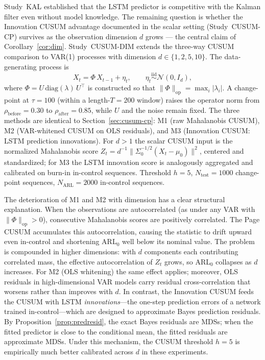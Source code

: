 \documentclass[bj,authoryear]{imsart}
\theoremstyle{plain}
\theoremstyle{definition}
\begin{document}
Study~KAL established that the LSTM predictor is competitive with the Kalman
filter even without model knowledge.
The remaining question is whether the Innovation CUSUM advantage documented
in the scalar setting (Study~CUSUM-CP) survives as the observation dimension $d$
grows --- the central claim of Corollary~\ref{cor:dim}.
Study~CUSUM-DIM extends the three-way CUSUM comparison to VAR(1) processes with
dimension $d \in \{1, 2, 5, 10\}$.
The data-generating process is
\[
  X_t = \Phi\,X_{t-1} + \eta_t, \qquad \eta_t \overset{\text{iid}}{\sim}
  \mathcal{N}(0, I_d),
\]
where $\Phi = U\,\mathrm{diag}(\lambda)\,U^\top$ is constructed so that
$\|\Phi\|_{\mathrm{op}} = \max_i |\lambda_i|$.
A change-point at $\tau = 100$ (within a length-$T=200$ window) raises the
operator norm from $\rho_{\mathrm{before}}=0.30$ to
$\rho_{\mathrm{after}}=0.85$, while $U$ and the noise remain fixed.
The three methods are identical to Section~\ref{sec:cusum-cp}:
M1 (raw Mahalanobis CUSUM),
M2 (VAR-whitened CUSUM on OLS residuals), and
M3 (Innovation CUSUM: LSTM prediction innovations).
For $d>1$ the scalar CUSUM input is the normalized Mahalanobis score
$Z_t = d^{-1}\|\Sigma_0^{-1/2}(X_t - \mu_0)\|^2$, centered and standardized;
for M3 the LSTM innovation score is analogously aggregated and calibrated
on burn-in in-control sequences.
Threshold $h=5$, $N_{\mathrm{test}}=1000$ change-point sequences,
$N_{\mathrm{ARL}}=2000$ in-control sequences.

The deterioration of M1 and M2 with dimension has a clear structural explanation.
When the observations are autocorrelated (as under any VAR with
$\|\Phi\|_{\mathrm{op}}>0$), consecutive Mahalanobis scores are positively
correlated.
The Page CUSUM accumulates this autocorrelation, causing the statistic to
drift upward even in-control and shortening ARL$_0$ well below its nominal
value.
The problem is compounded in higher dimensions: with $d$ components each
contributing correlated mass, the effective autocorrelation of $Z_t$ grows,
so ARL$_0$ collapses as $d$ increases.
For M2 (OLS whitening) the same effect applies; moreover, OLS residuals
in high-dimensional VAR models carry residual cross-correlation that
worsens rather than improves with $d$.
In contrast, the Innovation CUSUM feeds the CUSUM with LSTM \emph{innovations}---the
one-step prediction errors of a network trained in-control---which are designed to approximate Bayes prediction residuals.
By Proposition~\ref{prop:predresid}, the exact Bayes residuals are MDSs;
when the fitted predictor is close to the conditional mean, the fitted residuals
are approximate MDSs.  Under this mechanism, the CUSUM threshold $h=5$ is empirically much better calibrated across $d$ in these experiments.
\end{document}
